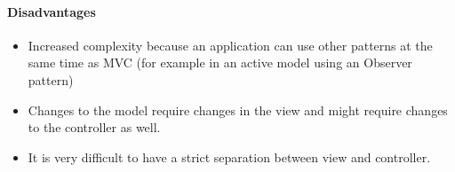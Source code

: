 \paragraph{Disadvantages}
\begin{itemize}
\item Increased complexity because an application can use other patterns at the same time as MVC (for example in an active model using an Observer pattern)
\item Changes to the model require changes in the view and might require changes to the controller as well.
\item It is very difficult to have a strict separation between view and controller. 
\end{itemize}